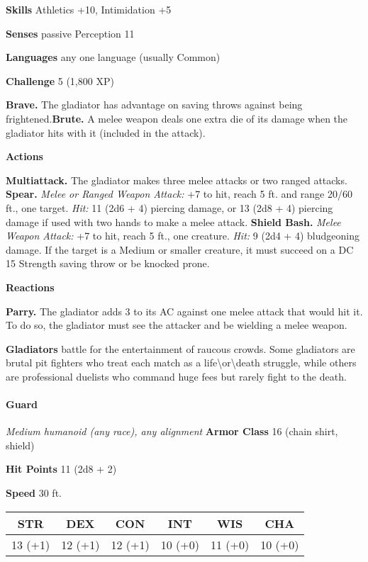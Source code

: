 \documentclass[
]{article}
\begin{document}
\textbf{Skills} Athletics +10, Intimidation +5

\textbf{Senses} passive Perception 11

\textbf{Languages} any one language (usually Common)

\textbf{Challenge} 5 (1,800 XP)

\textbf{Brave.} The gladiator has advantage on saving throws against
being frightened.\textbf{Brute.} A melee weapon deals one extra die of
its damage when the gladiator hits with it (included in the attack).

\textbf{Actions}

\textbf{Multiattack.} The gladiator makes three melee attacks or two
ranged attacks. \textbf{Spear.} \emph{Melee or Ranged Weapon Attack:} +7
to hit, reach 5 ft. and range 20/60 ft., one target. \emph{Hit:} 11 (2d6
+ 4) piercing damage, or 13 (2d8 + 4) piercing damage if used with two
hands to make a melee attack. \textbf{Shield Bash.} \emph{Melee Weapon
Attack:} +7 to hit, reach 5 ft., one creature. \emph{Hit:} 9 (2d4 + 4)
bludgeoning damage. If the target is a Medium or smaller creature, it
must succeed on a DC 15 Strength saving throw or be knocked prone.

\textbf{Reactions}

\textbf{Parry.} The gladiator adds 3 to its AC against one melee attack
that would hit it. To do so, the gladiator must see the attacker and be
wielding a melee weapon.

\textbf{Gladiators} battle for the entertainment of raucous crowds. Some
gladiators are brutal pit fighters who treat each match as a
life\textbackslash or\textbackslash death struggle, while others are
professional duelists who command huge fees but rarely fight to the
death.

\hypertarget{guard}{%
\paragraph{Guard}\label{guard}}

\emph{Medium humanoid (any race), any alignment} \textbf{Armor Class} 16
(chain shirt, shield)

\textbf{Hit Points} 11 (2d8 + 2)

\textbf{Speed} 30 ft.

\begin{longtable}[]{@{}cccccc@{}}
\toprule
STR & DEX & CON & INT & WIS & CHA\tabularnewline
\midrule
\endhead
13 (+1) & 12 (+1) & 12 (+1) & 10 (+0) & 11 (+0) & 10 (+0)\tabularnewline
\bottomrule
\end{longtable}
\end{document}
